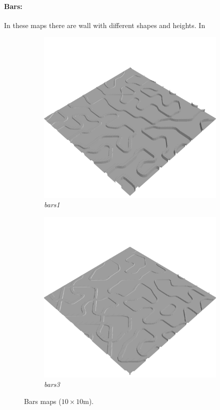 \documentclass[../document.tex]{subfiles}
\begin{document}
\paragraph{Bars:} In these maps there are wall with different shapes and heights. In 
\begin{figure}[H]
    \centering
        \begin{subfigure}[b]{0.32\textwidth}
            \includegraphics[width=\textwidth]{../img/hm3d/bars1.png}
            \caption{\emph{bars1}}
        \end{subfigure}
        \begin{subfigure}[b]{0.32 \linewidth}
            \includegraphics[width=\textwidth]{../img/hm3d/bars3.png}
            \caption{\emph{bars3}}
            \end{subfigure}     
    \label{fig: heightmaps}
    \caption{Bars maps ($10\times10$m).}
\end{figure}
\end{document}
